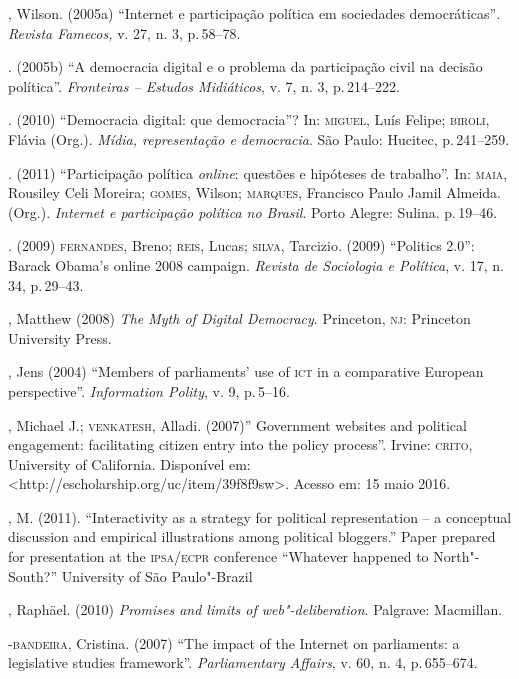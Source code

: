 \begin{bibliohedra}
, Wilson. (2005a) ``Internet e participação política em sociedades
democráticas''\emph{. Revista Famecos,} v. 27, n. 3, p.\,58--78.

\titidem. (2005b) ``A democracia digital e o problema da
participação civil na decisão política''. \emph{Fronteiras -- Estudos
Midiáticos}, v. 7, n. 3, p.\,214--222.

\titidem. (2010) ``Democracia digital: que democracia''? In:
\textsc{miguel}, Luís Felipe; \textsc{biroli}, Flávia (Org.). \emph{Mídia, representação e
democracia}. São Paulo: Hucitec, p.\,241--259.

\titidem. (2011) ``Participação política \emph{online}: questões e
hipóteses de trabalho''. In: \textsc{maia}, Rousiley Celi Moreira; \textsc{gomes}, Wilson;
\textsc{marques}, Francisco Paulo Jamil Almeida. (Org.). \emph{Internet e
participação política no Brasil}. Porto Alegre: Sulina. p.\,19--46.

\titidem. (2009) \textsc{fernandes}, Breno; \textsc{reis}, Lucas; \textsc{silva}, Tarcizio.
(2009) ``Politics 2.0'': Barack Obama's online 2008 campaign.
\emph{Revista de Sociologia e Política}, v. 17, n. 34, p.\,29--43.

, Matthew (2008) \emph{The Myth of Digital Democracy}. Princeton,
\textsc{nj}: Princeton University Press.

, Jens (2004) ``Members of parliaments' use of \textsc{ict} in a comparative
European perspective''. \emph{Information Polity}, v. 9, p.\,5--16.

, Michael J.; \textsc{venkatesh}, Alladi. (2007)'' Government websites and
political engagement: facilitating citizen entry into the policy
process''. Irvine: \textsc{crito}, University of California. Disponível em:
\textless{}http://escholarship.org/uc/item/39f8f9sw\textgreater{}.
Acesso em: 15 maio 2016.

, M. (2011). ``Interactivity as a strategy for political
representation -- a conceptual discussion and empirical illustrations
among political bloggers.'' Paper prepared for presentation at the
\textsc{ipsa}/\textsc{ecpr} conference ``Whatever happened to North"-South?'' University of
São Paulo"-Brazil

, Raphäel. (2010) \emph{Promises and limits of web"-deliberation}.
Palgrave: Macmillan.

-\textsc{bandeira}, Cristina. (2007) ``The impact of the Internet on
parliaments: a legislative studies framework''. \emph{Parliamentary
Affairs}, v. 60, n. 4, p.\,655--674.


\end{bibliohedra}
